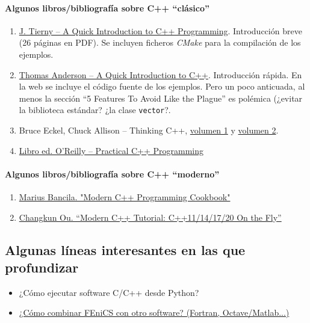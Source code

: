 \paragraph{Algunos libros/bibliografía sobre C++ ``clásico''}
\begin{enumerate}

\item \href{http://www-apr.lip6.fr/~tierny/stuff/teaching/tierny_visualization_introductionC++.pdf}{J. Tierny -- A Quick Introduction to C++ Programming}. Introducción breve (26 páginas en PDF). Se incluyen ficheros \textit{CMake} para la compilación de los ejemplos.
\item \href{https://homes.cs.washington.edu/~tom/c++example/}{Thomas Anderson -- A Quick Introduction to C++}. Introducción rápida. En la web se incluye el código fuente de los ejemplos. Pero un poco anticuada, al menos la sección ``5 Features To Avoid Like the Plague'' es polémica (¿evitar la biblioteca estándar? ¿la clase \texttt{vector}?.
\item Bruce Eckel, Chuck Allison -- Thinking C++, \href{http://vergil.chemistry.gatech.edu/resources/programming/pdf/TIC2Vone.pdf}{volumen 1} y \href{https://www.cs.rit.edu/~cs4/Thinking-in-C++2nd-ed-Volume-2.pdf}{volumen 2}.
\item \href{https://github.com/manish-old/ebooks-2/blob/master/O'Reilly\%20-\%20Practical\%20C\%2B\%2B\%20Programming.pdf}
{Libro ed. O'Reilly -- Practical C++ Programming}
\end{enumerate}

\paragraph{Algunos libros/bibliografía sobre C++ ``moderno''}
\begin{enumerate}
\item \href{https://consense.com.ua/en/lib/book/cpp_modern_cpp_progr_cookbook}{Marius Bancila.
"Modern C++ Programming Cookbook"}
\item \href{https://changkun.de/modern-cpp/pdf/modern-cpp-tutorial-en-us.pdf}{Changkun Ou. ``Modern C++ Tutorial: C++11/14/17/20 On the Fly''}

\end{enumerate}


\subsection{Algunas líneas interesantes en las que profundizar}
\label{sec:01:profundizar}


\begin{itemize}
\item ¿Cómo ejecutar software C/C++ desde Python?
\item \href{http://hplgit.github.io/fenics-mixed/doc/pub/fenics-mixed.html}{¿Cómo combinar FEniCS con otro software? (Fortran, Octave/Matlab...)}
\end{itemize}



